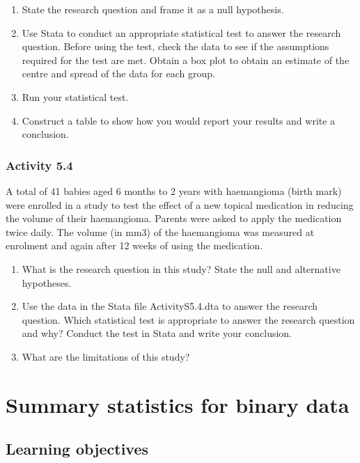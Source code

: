 \documentclass[
]{memoir}
\providecommand{\tightlist}{%
  \setlength{\itemsep}{0pt}\setlength{\parskip}{0pt}}
\begin{document}
\begin{enumerate}
\def\labelenumi{\alph{enumi})}
\tightlist
\item
  State the research question and frame it as a null hypothesis.
\item
  Use Stata to conduct an appropriate statistical test to answer the research question. Before using the test, check the data to see if the assumptions required for the test are met. Obtain a box plot to obtain an estimate of the centre and spread of the data for each group.
\item
  Run your statistical test.
\item
  Construct a table to show how you would report your results and write a conclusion.
\end{enumerate}

\hypertarget{activity-5.4}{%
\subsection*{Activity 5.4}\label{activity-5.4}}

A total of 41 babies aged 6 months to 2 years with haemangioma (birth mark) were enrolled in a study to test the effect of a new topical medication in reducing the volume of their haemangioma. Parents were asked to apply the medication twice daily. The volume (in mm3) of the haemangioma was measured at enrolment and again after 12 weeks of using the medication.

\begin{enumerate}
\def\labelenumi{\alph{enumi})}
\tightlist
\item
  What is the research question in this study? State the null and alternative hypotheses.
\item
  Use the data in the Stata file ActivityS5.4.dta to answer the research question. Which statistical test is appropriate to answer the research question and why? Conduct the test in Stata and write your conclusion.
\item
  What are the limitations of this study?
\end{enumerate}

\hypertarget{summary-statistics-for-binary-data}{%
\chapter{Summary statistics for binary data}\label{summary-statistics-for-binary-data}}

\hypertarget{learning-objectives-5}{%
\section*{Learning objectives}\label{learning-objectives-5}}
\end{document}

